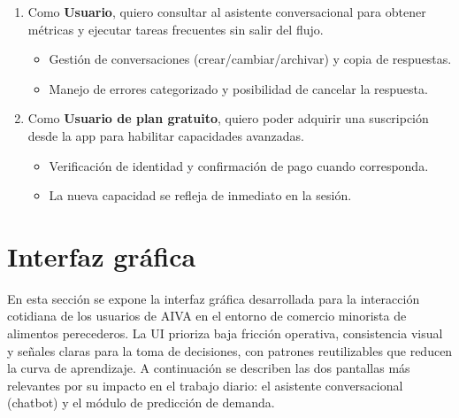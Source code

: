 \begin{enumerate}[label=HU-\arabic*., leftmargin=*, nosep]
\item Como \textbf{Usuario}, quiero consultar al asistente conversacional para obtener métricas y ejecutar tareas frecuentes sin salir del flujo.
\begin{itemize}[nosep]
\item Gestión de conversaciones (crear/cambiar/archivar) y copia de respuestas.
\item Manejo de errores categorizado y posibilidad de cancelar la respuesta.
\end{itemize}

\item Como \textbf{Usuario de plan gratuito}, quiero poder adquirir una suscripción desde la app para habilitar capacidades avanzadas.
\begin{itemize}[nosep]
\item Verificación de identidad y confirmación de pago cuando corresponda.
\item La nueva capacidad se refleja de inmediato en la sesión.
\end{itemize}

\end{enumerate}


\vspace{1cm}
\section{Interfaz gráfica}
En esta sección se expone la interfaz gráfica desarrollada para la interacción cotidiana de los usuarios de AIVA en el entorno de comercio minorista de alimentos perecederos. La UI prioriza baja fricción operativa, consistencia visual y señales claras para la toma de decisiones, con patrones reutilizables que reducen la curva de aprendizaje. A continuación se describen las dos pantallas más relevantes por su impacto en el trabajo diario: el asistente conversacional (chatbot) y el módulo de predicción de demanda.

